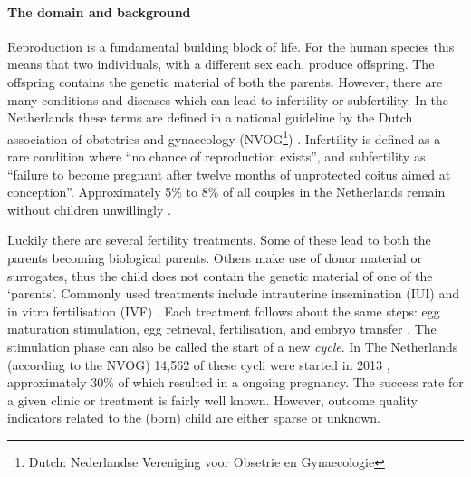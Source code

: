\paragraph{The domain and background}
Reproduction is a fundamental building block of life.
For the human species this means that two individuals, with a different sex each, produce offspring.
The offspring contains the genetic material of both the parents.
However, there are many conditions and diseases which can lead to infertility or subfertility.
In the Netherlands these terms are defined in a national guideline by the Dutch association of obstetrics and gynaecology (NVOG\footnote{Dutch: Nederlandse Vereniging voor Obsetrie en Gynaecologie}) \cite{subfertilityGuideline}.
Infertility is defined as a rare condition where ``no chance of reproduction exists'', 
and subfertility as ``failure to become pregnant after twelve months of unprotected coitus aimed at conception''.
Approximately 5\% to 8\% of all couples in the Netherlands remain without children unwillingly \cite{cbsStatistics, nhgStatistics}.

Luckily there are several fertility treatments.
Some of these lead to both the parents becoming biological parents. 
Others make use of donor material or surrogates, thus the child does not contain the genetic material of one of the `parents'.
Commonly used treatments include intrauterine insemination (IUI) and in vitro fertilisation (IVF) \cite{treatmentExplanation}.
Each treatment follows about the same steps: egg maturation stimulation, egg retrieval, fertilisation, and embryo transfer \cite{treatmentExplanation}.
The stimulation phase can also be called the start of a new \emph{cycle}. In The Netherlands (according to the NVOG) 14,562 of these cycli were started in 2013 \cite{ivfReportNVOG2013}, approximately 30\% of which resulted in a ongoing pregnancy.
The success rate for a given clinic or treatment is fairly well known.
However, outcome quality indicators related to the (born) child are either sparse or unknown.

